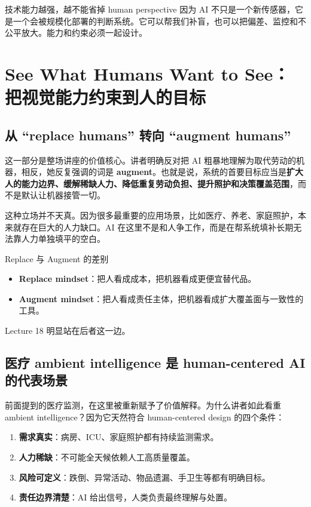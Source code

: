 \documentclass[a4paper]{article}
\begin{document}
\begin{warningbox}{技术能力越强，越不能省掉 human perspective}
因为 AI 不只是一个新传感器，它是一个会被规模化部署的判断系统。它可以帮我们补盲，也可以把偏差、监控和不公平放大。能力和约束必须一起设计。
\end{warningbox}

\section{See What Humans Want to See：把视觉能力约束到人的目标}

\subsection{从 ``replace humans'' 转向 ``augment humans''}

这一部分是整场讲座的价值核心。讲者明确反对把 AI 粗暴地理解为取代劳动的机器，相反，她反复强调的词是 \textbf{augment}。也就是说，系统的首要目标应当是\textbf{扩大人的能力边界、缓解稀缺人力、降低重复劳动负担、提升照护和决策覆盖范围}，而不是默认让机器接管一切。

这种立场并不天真。因为很多最重要的应用场景，比如医疗、养老、家庭照护，本来就存在巨大的人力缺口。AI 在这里不是和人争工作，而是在帮系统填补长期无法靠人力单独填平的空白。

\begin{importantbox}{Replace 与 Augment 的差别}
\begin{itemize}
    \item \textbf{Replace mindset}：把人看成成本，把机器看成更便宜替代品。
    \item \textbf{Augment mindset}：把人看成责任主体，把机器看成扩大覆盖面与一致性的工具。
\end{itemize}
Lecture 18 明显站在后者这一边。
\end{importantbox}

\subsection{医疗 ambient intelligence 是 human-centered AI 的代表场景}

前面提到的医疗监测，在这里被重新赋予了价值解释。为什么讲者如此看重 ambient intelligence？因为它天然符合 human-centered design 的四个条件：

\begin{enumerate}
    \item \textbf{需求真实}：病房、ICU、家庭照护都有持续监测需求。
    \item \textbf{人力稀缺}：不可能全天候依赖人工高质量覆盖。
    \item \textbf{风险可定义}：跌倒、异常活动、物品遗漏、手卫生等都有明确目标。
    \item \textbf{责任边界清楚}：AI 给出信号，人类负责最终理解与处置。
\end{enumerate}
\end{document}
